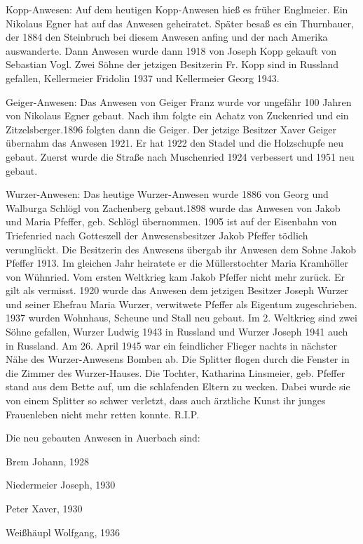 \documentclass{book}
\begin{document}
Kopp-Anwesen: Auf dem heutigen Kopp-Anwesen hieß es früher Englmeier. Ein
Nikolaus Egner hat auf das Anwesen geheiratet. Später besaß es ein Thurnbauer,
der 1884 den Steinbruch bei diesem Anwesen anfing und der nach Amerika
auswanderte. Dann Anwesen wurde dann 1918 von Joseph Kopp gekauft von Sebastian
Vogl. Zwei Söhne der jetzigen Besitzerin Fr. Kopp sind in Russland gefallen,
Kellermeier Fridolin 1937 und Kellermeier Georg 1943.

Geiger-Anwesen: Das Anwesen von Geiger Franz wurde vor ungefähr 100 Jahren von
Nikolaus Egner gebaut. Nach ihm folgte ein Achatz von Zuckenried und ein
Zitzelsberger.1896 folgten dann die Geiger. Der jetzige Besitzer Xaver Geiger
übernahm das Anwesen 1921. Er hat 1922 den Stadel und die Holzschupfe neu
gebaut. Zuerst wurde die Straße nach Muschenried 1924 verbessert und 1951 neu
gebaut.

Wurzer-Anwesen: Das heutige Wurzer-Anwesen wurde 1886 von Georg und Walburga
Schlögl von Zachenberg gebaut.1898 wurde das Anwesen von Jakob und Maria
Pfeffer, geb. Schlögl übernommen. 1905 ist auf der Eisenbahn von Triefenried
nach Gotteszell der Anwesensbesitzer Jakob Pfeffer tödlich verunglückt. Die
Besitzerin des Anwesens übergab ihr Anwesen dem Sohne Jakob Pfeffer 1913. Im
gleichen Jahr heiratete er die Müllerstochter Maria Kramhöller von Wühnried. Vom
ersten Weltkrieg kam Jakob Pfeffer nicht mehr zurück. Er gilt als vermisst. 1920
wurde das Anwesen dem jetzigen Besitzer Joseph Wurzer und seiner Ehefrau Maria
Wurzer, verwitwete Pfeffer als Eigentum zugeschrieben. 1937 wurden Wohnhaus,
Scheune und Stall neu gebaut. Im 2. Weltkrieg sind zwei Söhne gefallen, Wurzer
Ludwig 1943 in Russland und Wurzer Joseph 1941 auch in Russland. Am 26. April
1945 war ein feindlicher Flieger nachts in nächster Nähe des Wurzer-Anwesens
Bomben ab. Die Splitter flogen durch die Fenster in die Zimmer des
Wurzer-Hauses. Die Tochter, Katharina Linsmeier, geb. Pfeffer stand aus dem
Bette auf‚ um die schlafenden Eltern zu wecken. Dabei wurde sie von einem
Splitter so schwer verletzt, dass auch ärztliche Kunst ihr junges Frauenleben
nicht mehr retten konnte. R.I.P.



Die neu gebauten Anwesen in Auerbach sind:



Brem Johann, 1928

Niedermeier Joseph, 1930

Peter Xaver, 1930

Weißhäupl Wolfgang, 1936
\end{document}

